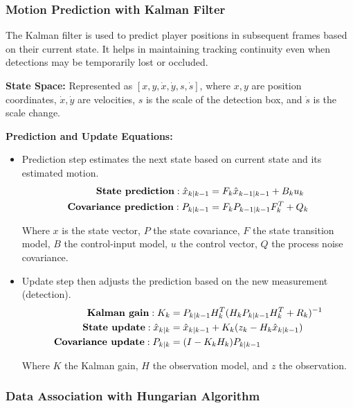 \documentclass[12pt, letterpaper]{article}
\begin{document}
{\begin{spacing}{1.2}
\subsubsection{Motion Prediction with Kalman Filter}

The Kalman filter is used to predict player positions in subsequent frames based on their current state. It helps in maintaining tracking continuity even when detections may be temporarily lost or occluded.

\textbf{State Space:} Represented as \([x, y, \dot{x}, \dot{y}, s, \dot{s}]\), where \(x, y\) are position coordinates, \(\dot{x}, \dot{y}\) are velocities, \(s\) is the scale of the detection box, and \(\dot{s}\) is the scale change.

\textbf{Prediction and Update Equations:}

\begin{itemize}
    \item Prediction step estimates the next state based on current state and its estimated motion.
    \begin{align}
        \text{\textbf{State prediction}}: \hat{x}_{k|k-1} &= F_k \hat{x}_{k-1|k-1} + B_k u_k \\
        \text{\textbf{Covariance prediction}}: P_{k|k-1} &= F_k P_{k-1|k-1} F_k^T + Q_k
    \end{align}

    Where \(x\) is the state vector, \(P\) the state covariance, \(F\) the state transition model, \(B\) the control-input model, \(u\) the control vector, \(Q\) the process noise covariance.
    
    \item Update step then adjusts the prediction based on the new measurement (detection).
    \begin{align}
        \text{\textbf{Kalman gain}}: K_k &= P_{k|k-1} H_k^T (H_k P_{k|k-1} H_k^T + R_k)^{-1} \\
        \text{\textbf{State update}}: \hat{x}_{k|k} &= \hat{x}_{k|k-1} + K_k(z_k - H_k \hat{x}_{k|k-1}) \\
        \text{\textbf{Covariance update}}: P_{k|k} &= (I - K_k H_k) P_{k|k-1}
    \end{align}
    
    Where \(K\) the Kalman gain, \(H\) the observation model, and \(z\) the observation.
\end{itemize}


\subsubsection{Data Association with Hungarian Algorithm}


\end{spacing}}
\end{document}
